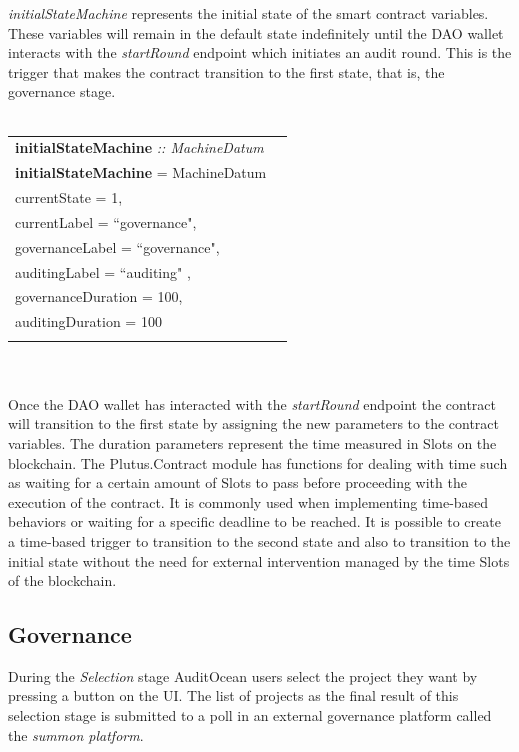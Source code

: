 \documentclass[9pt]{article}
\begin{document}
 \emph{initialStateMachine} represents the initial state of the smart contract variables. These variables will remain in the default state indefinitely until the DAO wallet interacts with the \emph{startRound} endpoint which initiates an audit round. This is the trigger that makes the contract transition to the first state, that is, the governance stage.
\\
\\
\begin{tabular}{lr}
\textbf{initialStateMachine} \emph{:: MachineDatum}\\
\textbf{initialStateMachine}  = MachineDatum  \textbraceleft{}
\\ \hspace{60mm}currentState = 1, 
\\ \hspace{60mm}currentLabel = ``governance",
\\ \hspace{60mm}governanceLabel = ``governance",
\\ \hspace{60mm}auditingLabel = ``auditing" ,
\\ \hspace{60mm}governanceDuration = 100,
\\ \hspace{60mm}auditingDuration = 100
\\\hspace{60mm}\textbraceright{} 
\end{tabular}
\\
\\
Once the DAO wallet has interacted with the \emph{startRound} endpoint the contract will transition to the first state by assigning the new parameters to the contract variables. The duration parameters represent the time measured in Slots on the blockchain. The Plutus.Contract module has functions for dealing with time such as waiting for a certain amount of Slots to pass before proceeding with the execution of the contract. It is commonly used when implementing time-based behaviors or waiting for a specific deadline to be reached. It is possible to create a time-based trigger to transition to the second state and also to transition to the initial state without the need for external intervention managed by the time Slots of the blockchain.

\subsection { Governance } 
During the \emph{Selection} stage AuditOcean users select the project they want by pressing a button on the UI. The list of projects as the final result of this selection stage is submitted to a poll in an external governance platform called the \emph{summon platform}.
\end{document}

